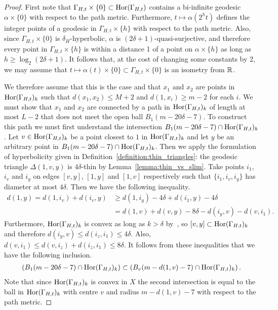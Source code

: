 \begin{proof}
  First note that $\Gamma_{H,t} \times \{0\} \subset \operatorname{Hor}(\Gamma_{H,t})$ contains a bi-infinite geodesic $\alpha \times \{0\}$ with respect to the path metric. 
  Furthermore, $t \mapsto \alpha(2^ht)$ defines the integer points of a geodesic in $\Gamma_{H,t} \times \{h\}$ with respect to the path metric.
  Also, since $\Gamma_{H,t} \times \{0\}$ is $\delta_H$-hyperbolic, $\alpha$ is $(2\delta+1)$-quasi-surjective, and therefore every point in $\Gamma_{H,t} \times \{h\}$ is within a distance 1 of a point on $\alpha \times \{h\}$ as long as $h \geq \log_2(2\delta+1)$.
  It follows that, at the cost of changing some constants by 2, we may assume that $t \mapsto \alpha(t) \times \{0\} \subset \Gamma_{H,t} \times \{0\}$ is an isometry from $\mathbb{R}$.

  We therefore assume that this is the case and that $x_1$ and $x_2$ are points in $\operatorname{Hor}(\Gamma_{H,t})_k$ such that $d(x_1, x_2) \leq M + 2$ and $d(1, x_i) \geq m-2$ for each $i$.
  We must show that $x_1$ and $x_2$ are connected by a path in $\operatorname{Hor}(\Gamma_{H,t})_k$ of length at most $L - 2$ that does not meet the open ball $B_1(m - 20\delta -7)$.
  To construct this path we must first understand the intersection $B_1(m - 20\delta - 7) \cap \operatorname{Hor}(\Gamma_{H,t})_k$.
  Let $v \in \operatorname{Hor}(\Gamma_{H,t})_k$ be a point closest to $1$ in $\operatorname{Hor}(\Gamma_{H,t})_k$ and let $y$ be an arbitrary point in $B_1(m - 20\delta - 7) \cap \operatorname{Hor}(\Gamma_{H,t})_k$.
  Then we apply the formulation of hyperbolicity given in Definition~\ref{definition:thin_triangles}: the geodesic triangle $\Delta(1, v, y)$ is $4\delta$-thin by Lemma~\ref{lemma:thin_vs_slim}.
  Take points $i_1$, $i_v$ and $i_y$ on edges $[v,y]$, $[1,y]$ and $[1,v]$ respectively such that $\{i_1, i_v, i_y\}$ has diameter at most $4\delta$.
  Then we have the following inequality.
  \begin{align*}
    d(1,y) = d(1,i_v) + d(i_v, y) & \geq d(1, i_y) - 4\delta + d(i_1, y) - 4\delta \\
                                  & = d(1, v) + d(v, y) - 8\delta - d(i_y, v) - d(v, i_1).
  \end{align*}
  Furthermore, $\operatorname{Hor}(\Gamma_{H,t})_k$ is convex as long as $k > \delta$ by~\cite[Lemma 3.26]{grovesmanning08}, so $[v,y] \subset \operatorname{Hor}(\Gamma_{H,t})_k$ and therefore $d(i_y, v) \leq d(i_z, i_1) \leq 4\delta$.
  Also, $d(v, i_1) \leq d(v, i_z) + d(i_z, i_1) \leq 8\delta$.
  It follows from these inequalities that we have the following inclusion.
  \begin{align*}
    \left(B_1(m - 20\delta - 7) \cap \operatorname{Hor}(\Gamma_{H,t})_k\right) \subset \left(B_v (m - d(1,v) - 7) \cap \operatorname{Hor}(\Gamma_{H,t})_k\right).
  \end{align*}
  Note that since $\operatorname{Hor}(\Gamma_{H,t})_k$ is convex in $X$ the second intersection is equal to the ball in $\operatorname{Hor}(\Gamma_{H,t})_k$ with centre $v$ and radius $m - d(1,v) - 7$ with respect to the path metric.


\end{proof}

